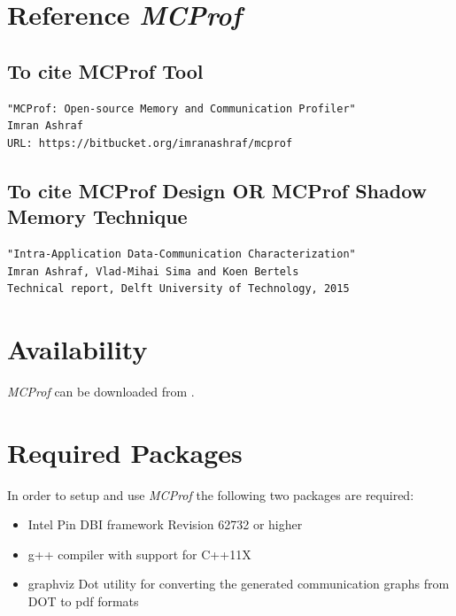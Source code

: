 \documentclass[11pt]{article}
\newcommand{\MCPROF}{\emph{MCProf}}
\begin{document}
\section{Reference \MCPROF{}}


\subsection{To cite MCProf Tool}

{
\scriptsize
\begin{Verbatim}[frame=single, samepage=true]
"MCProf: Open-source Memory and Communication Profiler"
Imran Ashraf
URL: https://bitbucket.org/imranashraf/mcprof
\end{Verbatim}
}

\subsection{To cite MCProf Design OR MCProf Shadow Memory Technique}

{
\scriptsize
\begin{Verbatim}[frame=single, samepage=true]
"Intra-Application Data-Communication Characterization"
Imran Ashraf, Vlad-Mihai Sima and Koen Bertels
Technical report, Delft University of Technology, 2015
\end{Verbatim}
}



\section{Availability}
\label{sec:availability}

\MCPROF{} can be downloaded from \cite{mcprofDownload}.


\section{Required Packages}
\label{sec:reqPackages}

In order to setup and use \MCPROF{} the following two packages are required:

\begin{itemize}

\item Intel Pin DBI framework \cite{Pin_Download} Revision 62732 or higher

\item g++ compiler with support for C++11X

\item  graphviz Dot utility for converting the generated communication graphs
    from DOT to pdf formats

\end{itemize}
\end{document}
